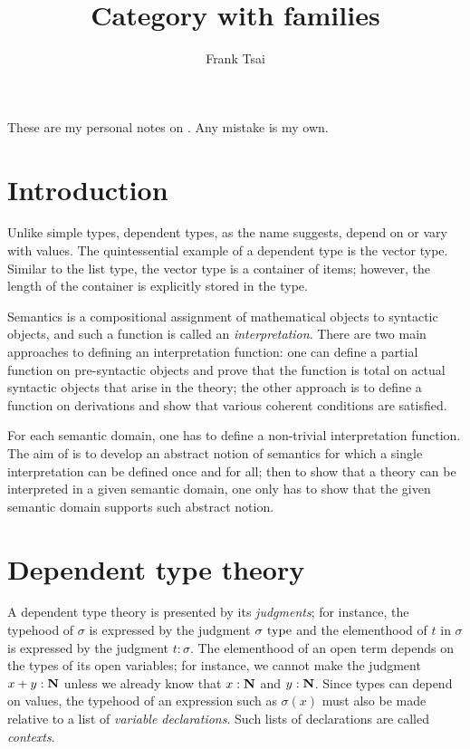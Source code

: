 \documentclass[a4paper]{article}
\title{Category with families}
\author{Frank Tsai}
\begin{document}
\maketitle

These are my personal notes on \cite{Hofmann1997}.
Any mistake is my own.

\section{Introduction}\label{sec:intro}

Unlike simple types, dependent types, as the name suggests, depend on or vary with values.
The quintessential example of a dependent type is the vector type.
Similar to the list type, the vector type is a container of items; however, the length of the container is explicitly stored in the type.

Semantics is a compositional assignment of mathematical objects to syntactic objects, and such a function is called an \emph{interpretation}.
There are two main approaches to defining an interpretation function: one can define a partial function on pre-syntactic objects and prove that the function is total on actual syntactic objects that arise in the theory; the other approach is to define a function on derivations and show that various coherent conditions are satisfied.

For each semantic domain, one has to define a non-trivial interpretation function.
The aim of \cite{Hofmann1997} is to develop an abstract notion of semantics for which a single interpretation can be defined once and for all; then to show that a theory can be interpreted in a given semantic domain, one only has to show that the given semantic domain supports such abstract notion.

\section{Dependent type theory}\label{sec:dtt}

A dependent type theory is presented by its \emph{judgments}; for instance, the typehood of $\sigma$ is expressed by the judgment $\sigma~\mathrm{type}$ and the elementhood of $t$ in $\sigma$ is expressed by the judgment $t : \sigma$.
The elementhood of an open term depends on the types of its open variables; for instance, we cannot make the judgment $x + y : \mathbf{N}$ unless we already know that $x : \mathbf{N}$ and $y : \mathbf{N}$.
Since types can depend on values, the typehood of an expression such as $\sigma(x)$ must also be made relative to a list of \emph{variable declarations}.
Such lists of declarations are called \emph{contexts}.
\end{document}
